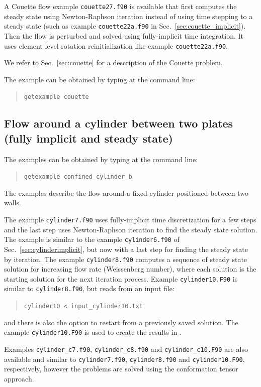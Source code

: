 A Couette flow example \texttt{couette27.f90} is available that first computes the steady state using Newton-Raphson iteration instead of using time stepping to a steady state (such as example \texttt{couette22a.f90} in Sec.~\ref{sec:couette_implicit}). Then the flow is perturbed and solved using fully-implicit time integration. It uses element level rotation reinitialization like example \texttt{couette22a.f90}.

We refer to Sec.~\ref{sec:couette} for a description of the Couette problem.

The example can be obtained by typing at the
command line:
\medskip
\begin{quote}
   \texttt{getexample couette}
\end{quote}

\subsection{Flow around a cylinder between two plates (fully implicit and steady state)}
\label{sec:confcyl2}
The examples can be obtained by typing at the command line:
\begin{quote}
   \texttt{getexample confined\_cylinder\_b}
\end{quote}

The examples describe the flow
around a fixed cylinder positioned between two walls. 

The example \texttt{cylinder7.f90} uses
fully-implicit time discretization for a few steps and the last step uses Newton-Raphson iteration to
find the steady state solution. The example is similar to the example \texttt{cylinder6.f90} of Sec.~\ref{sec:cylinderimplicit}, but now with a last step for finding the steady state by iteration.
The example \texttt{cylinder8.f90} computes a sequence of steady state solution for increasing flow rate (Weissenberg number), where each solution is the starting solution for the next iteration process. Example \texttt{cylinder10.F90} is similar to \texttt{cylinder8.f90}, but reads from an input file:
\begin{quote}
   \texttt{cylinder10 < input\_cylinder10.txt}
\end{quote}
and there is also the option to restart from a previously saved solution. The example \texttt{cylinder10.F90} is used to create the results in \cite{JaenssonHulsen2024}.

Examples \texttt{cylinder\_c7.f90}, \texttt{cylinder\_c8.f90} and \texttt{cylinder\_c10.F90} are also available
and similar to \texttt{cylinder7.f90}, \texttt{cylinder8.f90} and \texttt{cylinder10.F90}, respectively, however the problems are solved using the conformation tensor approach. 

